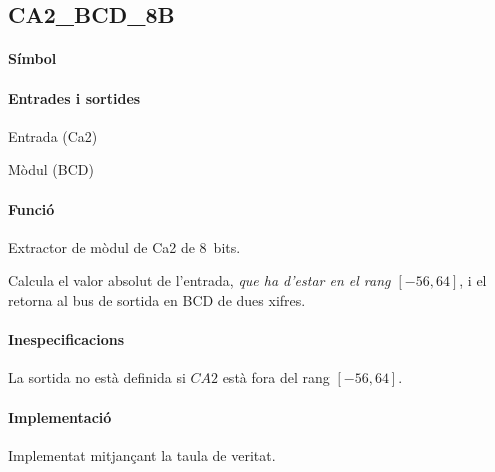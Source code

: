 \subsection{\label{sub:\projectname-CA2_BCD_8B} \textsf{CA2\_BCD\_8B}}

\paragraph{Símbol}
\begin{center}  \end{center}

\paragraph{Entrades i sortides}

\begin{where}
\item[\nodenamerange{CA2}{7}{0}] Entrada (Ca2)
\item[\nodenamerange{BCD}{7}{0}] Mòdul (BCD)
\end{where}

\paragraph{Funció}

Extractor de mòdul de Ca2 de 8~bits.

Calcula el valor absolut de l'entrada, \emph{que ha d'estar en el rang
$\left[-56, 64\right]$}, i el retorna al bus de sortida en BCD de dues xifres.

\paragraph{Inespecificacions}


La sortida no està definida si $CA2$ està fora del rang $\left[-56, 64\right]$.


\paragraph{Implementació}




Implementat mitjançant la taula de veritat.

\vspace{1cm}
